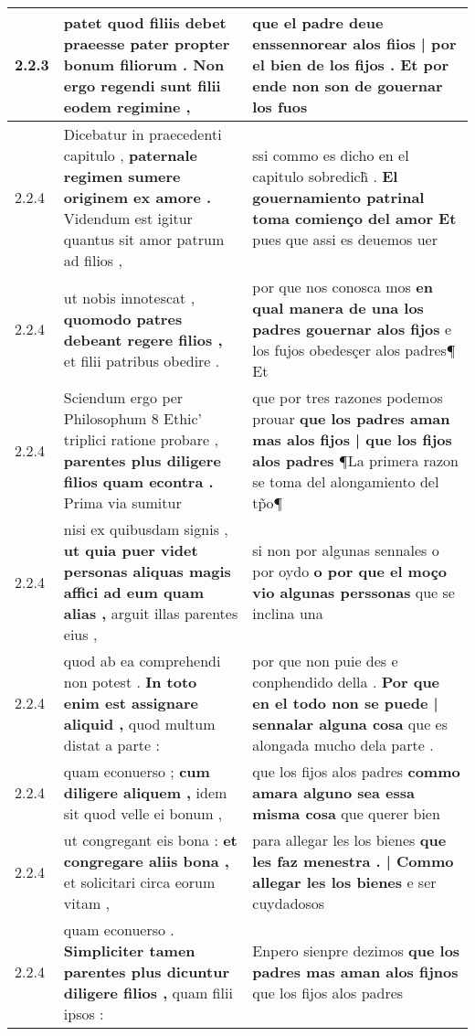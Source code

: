 \begin{tabular}{|p{1cm}|p{6.5cm}|p{6.5cm}|}
2.2.3 & patet quod filiis debet \textbf{ praeesse pater propter bonum filiorum . } Non ergo regendi sunt filii eodem regimine , & que el padre deue \textbf{ enssennorear alos fiios | por el bien de los fijos . } Et por ende non son de gouernar los fuos \\\hline
2.2.4 & Dicebatur in praecedenti capitulo , \textbf{ paternale regimen sumere originem ex amore . } Videndum est igitur quantus sit amor patrum ad filios , & ssi commo es dicho en el capitulo sobredich̃ . \textbf{ El gouernamiento patrinal toma comienço del amor Et } pues que assi es deuemos uer \\\hline
2.2.4 & ut nobis innotescat , \textbf{ quomodo patres debeant regere filios , } et filii patribus obedire . & por que nos conosca mos \textbf{ en qual manera de una los padres gouernar alos fijos } e los fujos obedesçer alos padres¶ Et \\\hline
2.2.4 & Sciendum ergo per Philosophum 8 Ethic’ triplici ratione probare , \textbf{ parentes plus diligere filios quam econtra . } Prima via sumitur & que por tres razones podemos prouar \textbf{ que los padres aman mas alos fijos | que los fijos alos padres } ¶La primera razon se toma del alongamiento del tp̃o¶ \\\hline
2.2.4 & nisi ex quibusdam signis , \textbf{ ut quia puer videt personas aliquas magis affici ad eum quam alias , } arguit illas parentes eius , & si non por algunas sennales o por oydo \textbf{ o por que el moço vio algunas perssonas } que se inclina una \\\hline
2.2.4 & quod ab ea comprehendi non potest . \textbf{ In toto enim est assignare aliquid , } quod multum distat a parte : & por que non puie des e conphendido della . \textbf{ Por que en el todo non se puede | sennalar alguna cosa } que es alongada mucho dela parte . \\\hline
2.2.4 & quam econuerso ; \textbf{ cum diligere aliquem , } idem sit quod velle ei bonum , & que los fijos alos padres \textbf{ commo amara alguno sea essa misma cosa } que querer bien \\\hline
2.2.4 & ut congregant eis bona : \textbf{ et congregare aliis bona , } et solicitari circa eorum vitam , & para allegar les los bienes \textbf{ que les faz menestra . | Commo allegar les los bienes } e ser cuydadosos \\\hline
2.2.4 & quam econuerso . \textbf{ Simpliciter tamen parentes plus dicuntur diligere filios , } quam filii ipsos : & Enpero sienpre dezimos \textbf{ que los padres mas aman alos fijnos } que los fijos alos padres \\\hline

\end{tabular}

